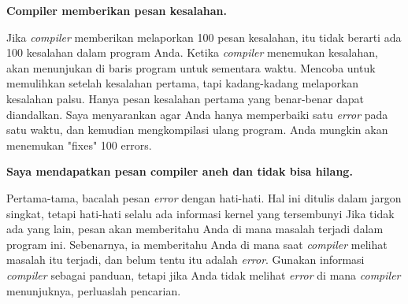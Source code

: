 \documentclass[12pt,b5paper,openright,twoside]{book}
\begin{document}
\noindent \textbf{Compiler memberikan pesan kesalahan.}

\noindent Jika \textit{compiler} memberikan melaporkan 100 pesan kesalahan, itu tidak berarti ada 100 kesalahan dalam program Anda. Ketika \textit{compiler} menemukan kesalahan, akan menunjukan di baris program untuk sementara waktu. Mencoba untuk memulihkan setelah kesalahan pertama, tapi kadang-kadang melaporkan kesalahan palsu.
Hanya pesan kesalahan pertama yang benar-benar dapat diandalkan. Saya menyarankan agar Anda hanya memperbaiki satu \textit{error} pada satu waktu, dan kemudian mengkompilasi ulang program. Anda mungkin akan menemukan "fixes" 100 errors.

\noindent \textbf{Saya mendapatkan pesan compiler aneh dan tidak bisa hilang.}

\noindent Pertama-tama, bacalah pesan \textit{error} dengan hati-hati. Hal ini ditulis dalam jargon singkat, tetapi hati-hati selalu ada informasi kernel yang tersembunyi
Jika tidak ada yang lain, pesan akan memberitahu Anda di mana masalah terjadi dalam program ini. Sebenarnya, ia memberitahu Anda di mana saat \textit{compiler} melihat masalah itu terjadi, dan belum tentu itu adalah \textit{error}. Gunakan informasi \textit{compiler} sebagai panduan, tetapi jika Anda tidak melihat \textit{error} di mana \textit{compiler} menunjuknya, perluaslah pencarian.
\end{document}
